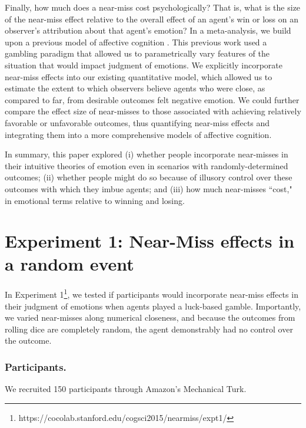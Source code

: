 \documentclass[10pt,letterpaper]{article}
\begin{document}
	
	Finally, how much does a near-miss cost psychologically? That is, what is the size of the near-miss effect relative to the overall effect of an agent's win or loss on an observer's attribution about that agent's emotion? In a meta-analysis, we build upon a previous model of affective cognition \cite{OngAffCog}. This previous work used a gambling paradigm that allowed us to parametrically vary features of the situation that would impact judgment of emotions. We explicitly incorporate near-miss effects into our existing quantitative model, which allowed us to estimate the extent to which observers believe agents who were close, as compared to far, from desirable outcomes felt negative emotion.  We could further compare the effect size of near-misses to those associated with achieving relatively favorable or unfavorable outcomes, thus quantifying near-miss effects and integrating them into a more comprehensive models of affective cognition.  


	In summary, this paper explored (i) whether people incorporate near-misses in their intuitive theories of emotion even in scenarios with randomly-determined outcomes; (ii) whether people might do so because of illusory control over these outcomes with which they imbue agents; and (iii) how much near-misses ``cost," in emotional terms relative to winning and losing.








\section{Experiment 1: Near-Miss effects in a random event}

	In Experiment 1\footnote{https://cocolab.stanford.edu/cogsci2015/nearmiss/expt1/}, we tested if participants would incorporate near-miss effects in their judgment of emotions when agents played a luck-based gamble. Importantly, we varied near-misses along numerical closeness, and because the outcomes from rolling dice are completely random, the agent demonstrably had no control over the outcome.

\subsubsection{Participants.} We recruited 150 participants through Amazon's Mechanical Turk.
\end{document}
